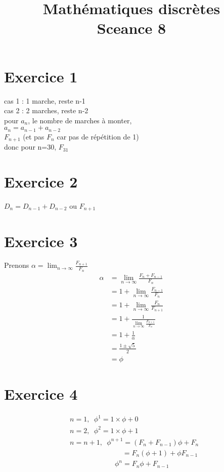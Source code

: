 \documentclass[fontsize=10pt]{article}
\title{\textbf{Mathématiques discrètes}\\ Sceance 8}
\date{}
\newcommand\tab[1][1cm]{\hspace*{#1}}
\begin{document}
\maketitle %

\section*{Exercice 1}

cas 1 : 1 marche, reste n-1 \\
cas 2 : 2 marches, reste n-2 \\
\tab pour $a_{n}$, le nombre de marches à monter, \\
\tab \tab $a_{n} = a_{n-1}+a_{n-2}$ \\
\tab \tab $F_{n+1}$ (et pas $F_{n}$ car pas de répétition de 1)\\
\tab \tab donc pour n=30, $F_{31}$

\section*{Exercice 2}
\tab \tab $D_{n} = D_{n-1}+D_{n-2}$ ou $F_{n+1}$ \\

\section*{Exercice 3}
Prenons $\alpha = \lim_{n\to\infty} \frac{F_{n+1}}{F_n}$
\begin{align*}
\alpha &= \lim_{n\to\infty} \frac{F_n + F_{n-1}}{F_n}\\
&= 1 + \lim_{n\to\infty} \frac{F_{n-1}}{F_n}\\
&= 1 + \lim_{n\to\infty} \frac{F_{n}}{F_{n+1}}\\
&= 1 + \frac{1}{\lim_{n\to\infty} \frac{F_{n+1}}{F_{n}}}\\
&= 1 + \frac{1}{\alpha}\\
&= \frac{1 \pm \sqrt{5}}{2}\\
&= \phi
\end{align*}
 
\section*{Exercice 4}
\begin{align*}
& n=1, \phantom{a}\phi^1 = 1 \times \phi + 0\\
& n=2, \phantom{a}\phi^2 = 1 \times \phi + 1\\
& n=n+1, \phantom{a}\phi^{n+1} = (F_n + F_{n-1})\phi + F_n\\
& \phantom{aaaaaaaaaaaaaa}= F_n (\phi + 1) + \phi F_{n-1}\\
& \phantom{aaaaaaaaaaaa}\phi^n = F_n\phi + F_{n-1}
\end{align*}
\end{document}
